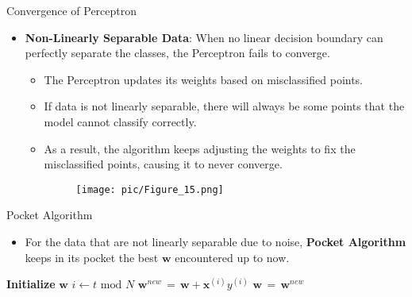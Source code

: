 \documentclass[serif, aspectratio=169]{beamer}
\begin{document}
\begin{frame}{Convergence of Perceptron}
    \begin{itemize}\itemsep1.5em
        \item \textbf{Non-Linearly Separable Data}:
        When no linear decision boundary can perfectly separate the classes, the Perceptron fails to converge.
        \medskip
        \begin{itemize}\itemsep1em
            \item The Perceptron updates its weights based on misclassified points.
            \item If data is not linearly separable, there will always be some points that the model cannot classify correctly.
            \item As a result, the algorithm keeps adjusting the weights to fix the misclassified points, causing it to never converge.
        \endminipage
        \hspace{1.5cm}
        \begin{figure}
            \centering
            \texttt{[image: pic/Figure\_15.png]}
        \end{figure}
        \endminipage
        \end{itemize}
    \end{itemize}
\end{frame}

\begin{frame}{Pocket Algorithm}
    \begin{itemize}
        \item For the data that are not linearly separable due to noise, \textbf{Pocket Algorithm} keeps in its pocket the best \(\mathbf{w}\) encountered up to now.
    \end{itemize}
    \begin{algorithm}[H]
    \caption{Pocket Algorithm}\label{alg:Pocket Algorithm}
    \begin{algorithmic}[1]
        \State \textbf{Initialize} $\mathbf{w}$
            \State \(i \leftarrow t \text{ mod } N\)
            \State \(\mathbf{w}^{new} \, = \, \mathbf{w} + \mathbf{x}^{(i)}y^{(i)}\)
            \State \(\mathbf{w} \, = \, \mathbf{w}^{new}\)
            \EndIf
            \EndIf
        \EndFor
    \end{algorithmic}
    \end{algorithm}
\end{frame}
\end{document}
